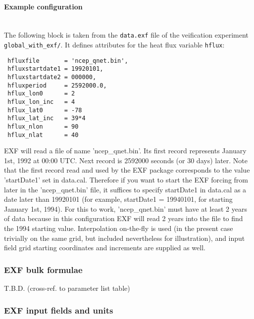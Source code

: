 \paragraph{Example configuration} ~ \\
%
The following block is taken from the \texttt{data.exf} file
of the veification experiment \texttt{global\_with\_exf/}.
It defines attributes for the heat flux variable \texttt{hflux}:

\begin{verbatim}
 hfluxfile       = 'ncep_qnet.bin',
 hfluxstartdate1 = 19920101,
 hfluxstartdate2 = 000000,
 hfluxperiod     = 2592000.0,
 hflux_lon0      = 2
 hflux_lon_inc   = 4
 hflux_lat0      = -78
 hflux_lat_inc   = 39*4
 hflux_nlon      = 90
 hflux_nlat      = 40
\end{verbatim}

EXF will read a file of name 'ncep\_qnet.bin'.
Its first record represents January 1st, 1992 at 00:00 UTC.
Next record is 2592000 seconds (or 30 days) later.
Note that the first record read and used by the EXF package corresponds to the
value 'startDate1' set in data.cal.  Therefore if you want to start the EXF
forcing from later in the 'ncep_qnet.bin' file, it suffices to specify
startDate1 in data.cal as a date later than 19920101 (for example, startDate1
= 19940101, for starting January 1st, 1994).  For this to work,
'ncep_qnet.bin' must have at least 2 years of data because in this
configuration EXF will read 2 years into the file to find the 1994 starting
value.
Interpolation on-the-fly is used (in the present case trivially
on the same grid, but included nevertheless for illustration), 
and input field grid starting coordinates and increments are 
supplied as well.


\subsubsection{EXF bulk formulae
\label{sec:pkg:exf:bulk_formulae}}

T.B.D. (cross-ref. to parameter list table)


\subsubsection{EXF input fields and units
\label{sec:pkg:exf:fields_units}}

